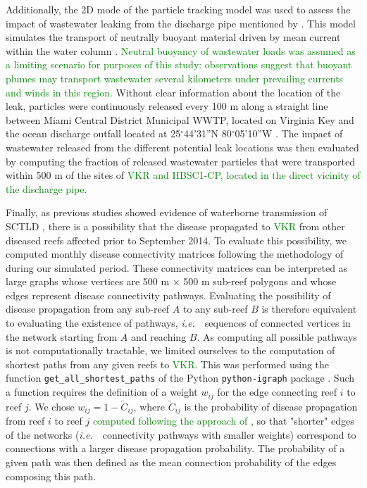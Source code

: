 \documentclass[preprint,12pt,authoryear]{elsarticle}
\newcommand{\ie}{{\it i.e.}\ }
\newcommand{\modif}[1]{\textcolor{green}{#1}}
\begin{document}
Additionally, the 2D mode of the particle tracking model was used to assess the impact of wastewater leaking from the discharge pipe mentioned by \cite{gintert2019regional}. This model simulates the transport of neutrally buoyant material driven by mean current within the water column \citep{dobbelaere2020coupled}. \modif{Neutral buoyancy of wastewater loads was assumed as a limiting scenario for purposes of this study: observations \citep{bloetscher2014use,wanninkhof2005farfield} suggest that buoyant plumes may transport wastewater several kilometers under prevailing currents and winds in this region.} Without clear information about the location of the leak, particles were continuously released every 100 m along a straight line between Miami Central District Municipal WWTP, located on Virginia Key and the ocean discharge outfall located at 25$^\circ$44'31''N 80$^\circ$05'10''W \citep{koopman2006ocean}. The impact of wastewater released from the different potential leak locations was then evaluated by computing the fraction of released wastewater particles that were transported within 500 m of the sites of \modif{VKR and HBSC1-CP, located in the direct vicinity of the discharge pipe}.

Finally, as previous studies showed evidence of waterborne transmission of SCTLD \citep{aeby2019pathogenesis, dobbelaere2020coupled,eaton2021measuring, meiling2021variable}, there is a possibility that the disease propagated to \modif{VKR} from other diseased reefs affected prior to September 2014. To evaluate this possibility, we computed monthly disease connectivity matrices following the methodology of \cite{dobbelaere2020coupled} during our simulated period. These connectivity matrices can be interpreted as large graphs whose vertices are 500 m $\times$ 500 m sub-reef polygons and whose edges represent disease connectivity pathways. Evaluating the possibility of disease propagation from any sub-reef $A$ to any sub-reef $B$ is therefore equivalent to evaluating the existence of pathways, \ie~sequences of connected vertices in the network starting from $A$ and reaching $B$. As computing all possible pathways is not computationally tractable, we limited ourselves to the computation of shortest paths from any given reefs to \modif{VKR}. This was performed using the function \texttt{get\_all\_shortest\_paths} of the Python \texttt{python-igraph} package \citep{csardi2006igraph}. Such a function requires the definition of a weight $w_{ij}$ for the edge connecting reef $i$ to reef $j$. We chose $w_{ij} = 1-\tilde{C}_{ij}$, where $\tilde{C}_{ij}$ is the probability of disease propagation from reef $i$ to reef $j$ \modif{computed following the approach of \cite{dobbelaere2020coupled}}, so that "shorter" edges of the networks (\ie~connectivity pathways with smaller weights) correspond to connections with a larger disease propagation probability. The probability of a given path was then defined as the mean connection probability of the edges composing this path.
\end{document}
